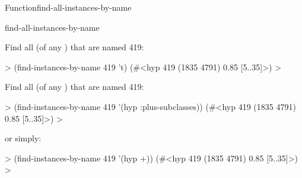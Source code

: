 \documentclass[10pt,twoside,english,pdftex]{article}
\begin{document}
\begin{functiondoc}{Function}{find-all-instances-by-name}
\begin{alsos}{find-all-instances-by-name}
\end{alsos}

\fnexamples
Find all  (of any ) that are named
419:
%
\W\supp
\begin{example}
  > (find-instances-by-name 419 't)
  (#<hyp 419 (1835 4791) 0.85 [5..35]>)
  >
\end{example}
%
Find all  (of any ) that are named
419:
%
\W\supp\notpretop
\begin{example}
  > (find-instances-by-name 419 '(hyp :plus-subclasses))
  (#<hyp 419 (1835 4791) 0.85 [5..35]>)
  >
\end{example}
%
or simply:
%
\W\supp\notpretop
\begin{example}
  > (find-instances-by-name 419 '(hyp +))
  (#<hyp 419 (1835 4791) 0.85 [5..35]>)
  >
\end{example}

\end{functiondoc}

\end{document}
